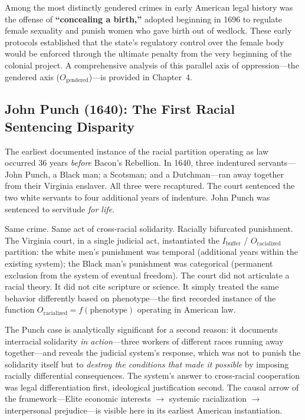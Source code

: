 \documentclass[12pt,openany]{book}
\begin{document}
Among the most distinctly gendered crimes in early American legal history was the offense of \textbf{``concealing a birth,''} adopted beginning in 1696 to regulate female sexuality and punish women who gave birth out of wedlock. These early protocols established that the state's regulatory control over the female body would be enforced through the ultimate penalty from the very beginning of the colonial project. A comprehensive analysis of this parallel axis of oppression---the gendered axis ($O_{\text{gendered}}$)---is provided in Chapter~4.

\subsection{John Punch (1640): The First Racial Sentencing Disparity}

The earliest documented instance of the racial partition operating as law occurred 36 years \textit{before} Bacon's Rebellion. In 1640, three indentured servants---John Punch, a Black man; a Scotsman; and a Dutchman---ran away together from their Virginia enslaver. All three were recaptured. The court sentenced the two white servants to four additional years of indenture. John Punch was sentenced to servitude \textit{for life}.

Same crime. Same act of cross-racial solidarity. Racially bifurcated punishment. The Virginia court, in a single judicial act, instantiated the $I_{\text{buffer}}$ / $O_{\text{racialized}}$ partition: the white men's punishment was temporal (additional years within the existing system); the Black man's punishment was categorical (permanent exclusion from the system of eventual freedom). The court did not articulate a racial theory. It did not cite scripture or science. It simply treated the same behavior differently based on phenotype---the first recorded instance of the function $O_{\text{racialized}} = f(\text{phenotype})$ operating in American law.

The Punch case is analytically significant for a second reason: it documents interracial solidarity \textit{in action}---three workers of different races running away together---and reveals the judicial system's response, which was not to punish the solidarity itself but to \textit{destroy the conditions that made it possible} by imposing racially differential consequences. The system's answer to cross-racial cooperation was legal differentiation first, ideological justification second. The causal arrow of the framework---Elite economic interests $\rightarrow$ systemic racialization $\rightarrow$ interpersonal prejudice---is visible here in its earliest American instantiation.
\end{document}
